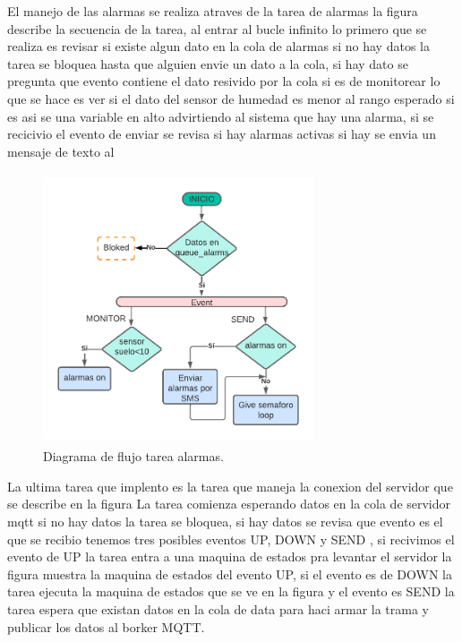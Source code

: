 El manejo de las alarmas se realiza atraves de la tarea de alarmas la figura describe la secuencia de la tarea, 
al entrar al bucle infinito lo primero que se realiza es revisar si existe algun dato en la cola de alarmas si no hay datos la tarea se bloquea hasta que alguien envie un dato a la cola, si hay dato se pregunta que evento contiene el dato resivido por la cola si es de monitorear lo que se hace es ver si el dato del sensor de humedad es menor al rango esperado si es asi se una variable en alto advirtiendo al sistema que hay una alarma, si se recicivio el evento de enviar se revisa si hay alarmas activas si hay se envia un mensaje de texto al 

\begin{figure}[htbp]
  \centering
	\includegraphics[width=8cm, height=8cm]{./Figures/DF_alarms.png}
	\caption{Diagrama de flujo tarea alarmas.}
	\label{fig:Df tarea alarms}
\end{figure}

La ultima tarea que implento es la tarea que maneja la conexion del servidor que se describe en la figura 
La tarea comienza esperando datos en la cola de servidor mqtt si no hay datos la tarea se bloquea, si hay datos se revisa que evento es el que se recibio tenemos tres posibles eventos UP, DOWN y SEND ,
si recivimos el evento de UP la tarea entra a una maquina de estados pra levantar el servidor la figura muestra la maquina de estados del evento UP, si el evento es de DOWN la tarea ejecuta la maquina de estados que se ve en la figura y el evento es SEND la tarea espera que existan datos en la cola de data para haci armar la trama y publicar los datos al borker MQTT.

